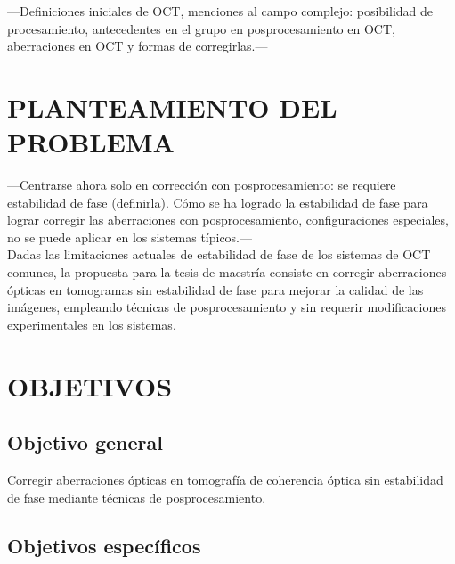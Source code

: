 \documentclass[letter, 12 pt]{article}
\begin{document}
---Definiciones iniciales de OCT, menciones al campo complejo: posibilidad de procesamiento, antecedentes en el grupo en posprocesamiento en OCT, aberraciones en OCT y formas de corregirlas.---


\section{PLANTEAMIENTO DEL PROBLEMA}

---Centrarse ahora solo en corrección con posprocesamiento: se requiere estabilidad de fase (definirla). Cómo se ha logrado la estabilidad de fase para lograr corregir las aberraciones con posprocesamiento, configuraciones especiales, no se puede aplicar en los sistemas típicos.--- \\

Dadas las limitaciones actuales de estabilidad de fase de los sistemas de OCT comunes, la propuesta para la tesis de maestría consiste en corregir aberraciones ópticas en tomogramas sin estabilidad de fase para mejorar la calidad de las imágenes, empleando técnicas de posprocesamiento y sin requerir modificaciones experimentales en los sistemas. \\


\section{OBJETIVOS}


\subsection{Objetivo general}

Corregir aberraciones ópticas en tomografía de coherencia óptica sin estabilidad de fase mediante técnicas de posprocesamiento.


\subsection{Objetivos específicos}
\end{document}
